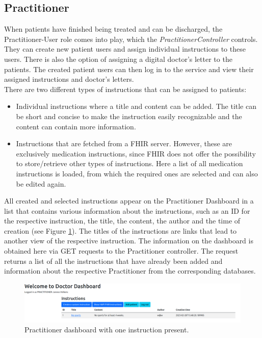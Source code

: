 \documentclass[]{report}
\begin{document}
\subsection{Practitioner}
When patients have finished being treated and can be discharged, the Practitioner-User role comes into play, which the \textit{PractitionerController} controls. They can create new patient users and assign individual instructions to these users. There is also the option of assigning a digital doctor's letter to the patients. The created patient users can then log in to the service and view their assigned instructions and doctor's letters.\\
There are two different types of instructions that can be assigned to patients:\\
\begin{itemize}
    \item Individual instructions where a title and content can be added. The title can be short and concise to make the instruction easily recognizable and the content can contain more information.
    \item Instructions that are fetched from a FHIR server. However, these are exclusively medication instructions, since FHIR does not offer the possibility to store/retrieve other types of instructions. Here a list of all medication instructions is loaded, from which the required ones are selected and can also be edited again.
\end{itemize}
All created and selected instructions appear on the Practitioner Dashboard in a list that contains various information about the instructions, such as an ID for the respective instruction, the title, the content, the author and the time of creation (see Figure \ref{fig:practitioner_dashboard}). The titles of the instructions are links that lead to another view of the respective instruction. The information on the dashboard is obtained here via GET requests to the Practitioner controller. The request returns a list of all the instructions that have already been added and information about the respective Practitioner from the corresponding databases.\\
\begin{figure}[h]
    \centering
    \includegraphics[width=1\textwidth]{Practitioner_Dashboard.png}
    \caption{Practitioner dashboard with one instruction present.}
    \label{fig:practitioner_dashboard}
\end{figure}
\end{document}
